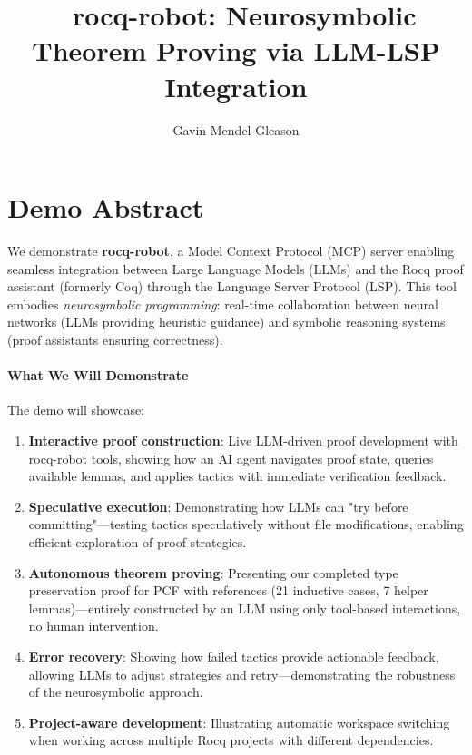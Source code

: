 \documentclass[sigconf,screen]{acmart}
\begin{document}
\title{🤖 rocq-robot: Neurosymbolic Theorem Proving via LLM-LSP Integration}

\author{Gavin Mendel-Gleason}

\maketitle

\section*{Demo Abstract}

We demonstrate \textbf{rocq-robot}, a Model Context Protocol (MCP) server enabling seamless integration between Large Language Models (LLMs) and the Rocq proof assistant (formerly Coq) through the Language Server Protocol (LSP). This tool embodies \emph{neurosymbolic programming}: real-time collaboration between neural networks (LLMs providing heuristic guidance) and symbolic reasoning systems (proof assistants ensuring correctness).

\paragraph{What We Will Demonstrate}

The demo will showcase:

\begin{enumerate}
\item \textbf{Interactive proof construction}: Live LLM-driven proof development with rocq-robot tools, showing how an AI agent navigates proof state, queries available lemmas, and applies tactics with immediate verification feedback.

\item \textbf{Speculative execution}: Demonstrating how LLMs can "try before committing"—testing tactics speculatively without file modifications, enabling efficient exploration of proof strategies.

\item \textbf{Autonomous theorem proving}: Presenting our completed type preservation proof for PCF with references (21 inductive cases, 7 helper lemmas)—entirely constructed by an LLM using only tool-based interactions, no human intervention.

\item \textbf{Error recovery}: Showing how failed tactics provide actionable feedback, allowing LLMs to adjust strategies and retry—demonstrating the robustness of the neurosymbolic approach.

\item \textbf{Project-aware development}: Illustrating automatic workspace switching when working across multiple Rocq projects with different dependencies.
\end{enumerate}
\end{document}
